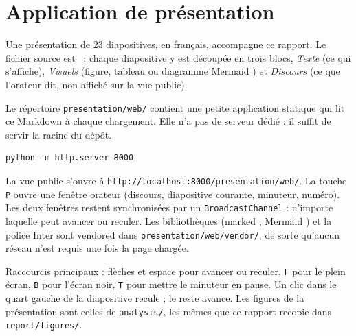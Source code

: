 \chapter{Application de présentation}
\label{chap-presentation}

Une présentation de 23 diapositives, en français, accompagne ce rapport. Le fichier source est ~: chaque diapositive y est découpée en trois blocs, \emph{Texte} (ce qui s'affiche), \emph{Visuels} (figure, tableau ou diagramme Mermaid \cite{mermaid}) et \emph{Discours} (ce que l'orateur dit, non affiché sur la vue public).

Le répertoire \texttt{presentation/web/} contient une petite application statique qui lit ce Markdown à chaque chargement. Elle n'a pas de serveur dédié : il suffit de servir la racine du dépôt.

\begin{lstlisting}
python -m http.server 8000
\end{lstlisting}

La vue public s'ouvre à \texttt{http://localhost:8000/presentation/web/}. La touche \texttt{P} ouvre une fenêtre orateur (discours, diapositive courante, minuteur, numéro). Les deux fenêtres restent synchronisées par un \texttt{BroadcastChannel} : n'importe laquelle peut avancer ou reculer. Les bibliothèques (marked \cite{markedjs}, Mermaid \cite{mermaid}) et la police Inter sont vendored dans \texttt{presentation/web/vendor/}, de sorte qu'aucun réseau n'est requis une fois la page chargée.

Raccourcis principaux : flèches et espace pour avancer ou reculer, \texttt{F} pour le plein écran, \texttt{B} pour l'écran noir, \texttt{T} pour mettre le minuteur en pause. Un clic dans le quart gauche de la diapositive recule ; le reste avance. Les figures de la présentation sont celles de \texttt{analysis/}, les mêmes que ce rapport recopie dans \texttt{report/figures/}.

